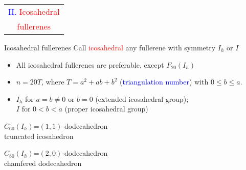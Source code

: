 \documentclass[%
pdf,
colorBG,
slideColor,
]{prosper}
\begin{document}
\begin{slide}{}
\begin{center}
{\Huge 
\begin{tabular*}{7cm}{c}
\\[-0.3cm]
\textcolor{blue}{II. }\textcolor{red}{Icosahedral}\\
\textcolor{red}{fullerenes}
\end{tabular*}
}
\end{center}
\end{slide}


\begin{slide}{Icosahedral fullerenes}
\vspace{-6mm}
Call \textcolor{red}{icosahedral} any fullerene with symmetry $I_h$ or $I$
\begin{itemize}
\item All icosahedral fullerenes are preferable, except $F_{20}(I_h)$
\item $n=20T$, where $T=a^2+ab+b^2$ (\textcolor{blue}{triangulation number})
 with $0\leq b\leq a$.

\item $I_h$ for $a=b\not= 0$ or $b=0$ (extended icosahedral group);\\
$I$ for $0<b<a$ (proper icosahedral group)
\end{itemize}

\begin{center}
\begin{minipage}{5.5cm}
\par
$C_{60}(I_h)$=$(1,1)$-dodecahedron\\
truncated icosahedron
\end{minipage}
\begin{minipage}{5.5cm}
\par
$C_{80}(I_h)$=$(2,0)$-dodecahedron\\
chamfered dodecahedron
\end{minipage}
\end{center}

\end{slide}
\end{document}
